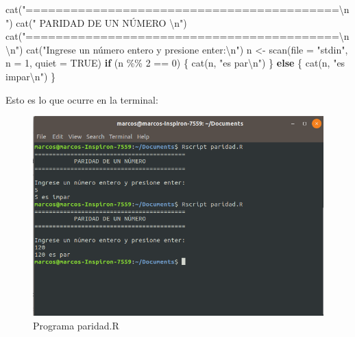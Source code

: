 \documentclass[
]{book}
\newenvironment{Shaded}{\begin{snugshade}}{\end{snugshade}}
\newcommand{\AttributeTok}[1]{\textcolor[rgb]{0.77,0.63,0.00}{#1}}
\newcommand{\ConstantTok}[1]{\textcolor[rgb]{0.00,0.00,0.00}{#1}}
\newcommand{\ControlFlowTok}[1]{\textcolor[rgb]{0.13,0.29,0.53}{\textbf{#1}}}
\newcommand{\DecValTok}[1]{\textcolor[rgb]{0.00,0.00,0.81}{#1}}
\newcommand{\FunctionTok}[1]{\textcolor[rgb]{0.00,0.00,0.00}{#1}}
\newcommand{\NormalTok}[1]{#1}
\newcommand{\OtherTok}[1]{\textcolor[rgb]{0.56,0.35,0.01}{#1}}
\newcommand{\SpecialCharTok}[1]{\textcolor[rgb]{0.00,0.00,0.00}{#1}}
\newcommand{\StringTok}[1]{\textcolor[rgb]{0.31,0.60,0.02}{#1}}
\begin{document}
\begin{Shaded}
\begin{Highlighting}[]
\FunctionTok{cat}\NormalTok{(}\StringTok{"==========================================}\SpecialCharTok{\textbackslash{}n}\StringTok{"}\NormalTok{)}
\FunctionTok{cat}\NormalTok{(}\StringTok{"           PARIDAD DE UN NÚMERO           }\SpecialCharTok{\textbackslash{}n}\StringTok{"}\NormalTok{)}
\FunctionTok{cat}\NormalTok{(}\StringTok{"==========================================}\SpecialCharTok{\textbackslash{}n\textbackslash{}n}\StringTok{"}\NormalTok{)}
\FunctionTok{cat}\NormalTok{(}\StringTok{"Ingrese un número entero y presione enter:}\SpecialCharTok{\textbackslash{}n}\StringTok{"}\NormalTok{)}
\NormalTok{n }\OtherTok{\textless{}{-}} \FunctionTok{scan}\NormalTok{(}\AttributeTok{file =} \StringTok{"stdin"}\NormalTok{, }\AttributeTok{n =} \DecValTok{1}\NormalTok{, }\AttributeTok{quiet =} \ConstantTok{TRUE}\NormalTok{)}
\ControlFlowTok{if}\NormalTok{ (n }\SpecialCharTok{\%\%} \DecValTok{2} \SpecialCharTok{==} \DecValTok{0}\NormalTok{) \{}
    \FunctionTok{cat}\NormalTok{(n, }\StringTok{"es par}\SpecialCharTok{\textbackslash{}n}\StringTok{"}\NormalTok{)}
\NormalTok{\} }\ControlFlowTok{else}\NormalTok{ \{}
    \FunctionTok{cat}\NormalTok{(n, }\StringTok{"es impar}\SpecialCharTok{\textbackslash{}n}\StringTok{"}\NormalTok{)}
\NormalTok{\}}
\end{Highlighting}
\end{Shaded}

Esto es lo que ocurre en la terminal:

\begin{figure}

{\centering \includegraphics[width=0.8\linewidth]{images/07_otros/consola2} 

}

\caption{Programa paridad.R}\label{fig:unnamed-chunk-199}
\end{figure}
\end{document}
